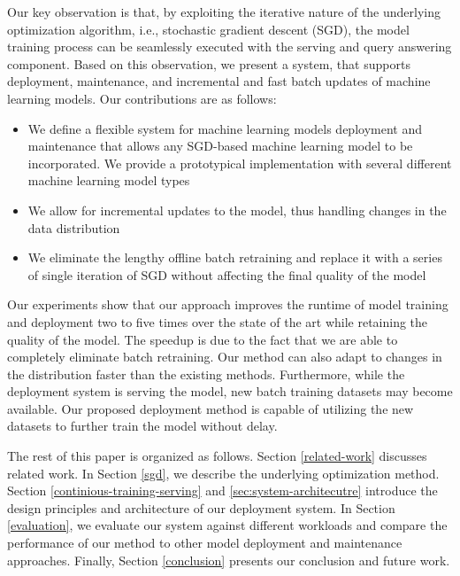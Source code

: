 \documentclass[10pt,conference,letterpaper]{IEEEtran}
\begin{document}
Our key observation is that, by exploiting the iterative nature of the underlying optimization algorithm, i.e., stochastic gradient descent (SGD), the model training process can be seamlessly executed with the serving and query answering component.
Based on this observation, we present a system, that supports deployment, maintenance, and incremental and fast batch updates of machine learning models.
Our contributions are as follows:
\begin{itemize}
\item We define a flexible system for machine learning models deployment and maintenance that allows any SGD-based machine learning model to be incorporated. We provide a prototypical implementation with several different machine learning model types
\item We allow for incremental updates to the model, thus handling changes in the data distribution
\item We eliminate the lengthy offline batch retraining and replace it with a series of single iteration of SGD without affecting the final quality of the model
\end{itemize}
Our experiments show that our approach improves the runtime of model training and deployment two to five times over the state of the art while retaining the quality of the model. 
The speedup is due to the fact that we are able to completely eliminate batch retraining. 
Our method can also adapt to changes in the distribution faster than the existing methods.
Furthermore, while the deployment system is serving the model, new batch training datasets may become available.
Our proposed deployment method is capable of utilizing the new datasets to further train the model without delay.

The rest of this paper is organized as follows. 
Section \ref {related-work} discusses related work.
In Section \ref{sgd}, we describe the underlying optimization method.
Section \ref{continious-training-serving} and \ref{sec:system-architecutre} introduce the design principles and architecture of our deployment system.
In Section \ref{evaluation}, we evaluate our system against different workloads and compare the performance of our method to other model deployment and maintenance approaches. 
Finally, Section \ref{conclusion} presents our conclusion and future work.
\end{document}
